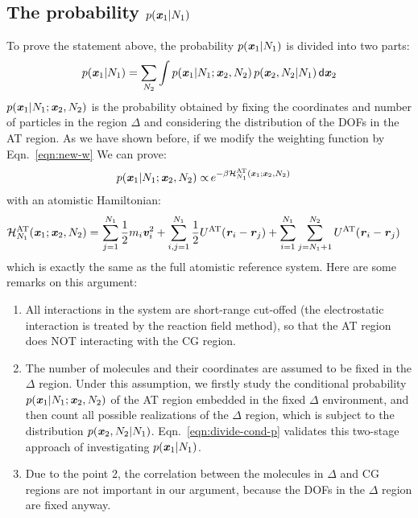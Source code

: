 \documentclass[aip,jcp,a4paper,reprint,onecolumn]{revtex4-1}
\newcommand{\vect}[1]{\textbf{\textit{#1}}}
\newcommand{\dd}[1]{\textsf{#1}}
\newcommand{\AT}{{\textrm{{AT}}}}
\newcommand{\HY}{{\Delta}}
\begin{document}
\subsection{The probability $p(\vect x_1 | N_1)$}
To prove the statement above, the probability $p(\vect x_1 | N_1)$ is divided into two parts:
\begin{align}\label{eqn:divide-cond-p}
  p(\vect x_1 | N_1) = \sum_{N_2}\int
  p(\vect x_1 | N_1; \vect x_2, N_2) \,
  p(\vect x_2, N_2 | N_1)
  \,\dd d\vect x_2
\end{align}
$p(\vect x_1 | N_1; \vect x_2, N_2)$ is the probability obtained by fixing the
coordinates and number of particles in the region $\HY$ and considering
the distribution of the DOFs in the AT region. As we have shown before,
if we modify the weighting function by Eqn.~\eqref{eqn:new-w}
We can prove:
\begin{align}
  p(\vect x_1 | N_1; \vect x_2, N_2)
  \propto &\,
  e^{-\beta\mathcal H_{N_1}^{\AT}(\vect x_1; \vect x_2, N_2)}
\end{align}
with an atomistic Hamiltonian:
\begin{align}
  \mathcal H_{N_1}^{{\AT}}(\vect x_1; \vect x_2, N_2) = &\,
  \sum_{j=1}^{N_1}\frac12 m_i\vect v_i^2 + 
  \sum_{i,j=1}^{N_1}\frac12 U^{{\AT}}(\vect r_i - \vect r_j)  +
  \sum_{i=1}^{N_1}\sum_{j=N_1+1}^{N_2} U^{{\AT}}(\vect r_i - \vect r_j)   
\end{align}
which is exactly the same as the full atomistic reference system.
Here are some remarks on this argument:
\begin{enumerate}\itemsep -1pt
\item All interactions in the system are short-range cut-offed (the
  electrostatic interaction is treated by the reaction field method),
  so that the AT region does NOT interacting with the CG region.
\item The number of molecules and their coordinates are assumed to be
  fixed in the $\HY$ region.  Under this assumption, we firstly study
  the conditional probability $p(\vect x_1 | N_1; \vect x_2, N_2)$ of
  the AT region embedded in the fixed $\HY$ environment, and then count
  all possible realizations of the $\HY$ region, which is subject to
  the distribution $p(\vect x_2, N_2 | N_1)$.
  Eqn.~\eqref{eqn:divide-cond-p} validates this two-stage approach of
  investigating $p(\vect x_1 | N_1)$.
\item Due to the point 2, the correlation between the molecules
  in $\HY$ and CG regions are not important in our argument, because
  the DOFs in the $\HY$ region are fixed anyway.
\end{enumerate}
\end{document}
